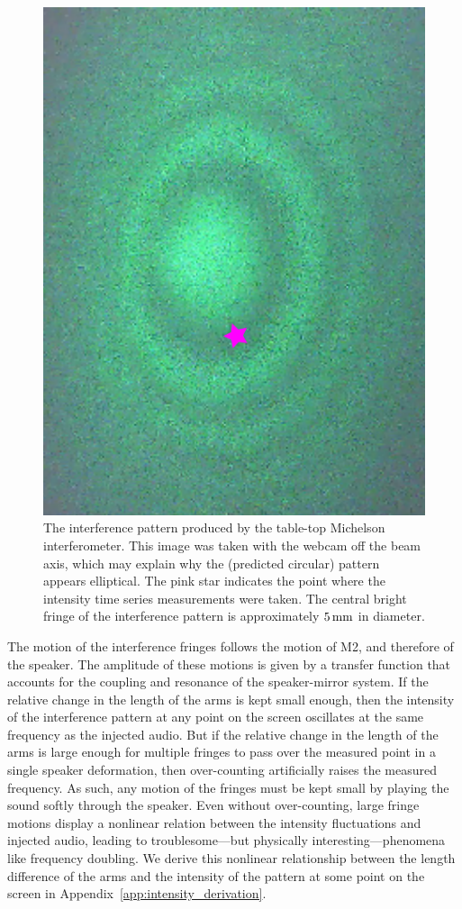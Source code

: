\documentclass[paper-main.tex]{subfiles}
\begin{document}
\begin{figure}
 \begin{center}
  \includegraphics[height=0.3\textwidth, angle=-90]{figures/webcam_still0_star.pdf}
 \end{center}
 \caption{\label{fig:interference_pattern}
The interference pattern produced by the table-top Michelson interferometer.
This image was taken with the webcam off the beam axis, which may explain why the (predicted circular) pattern appears elliptical.
The pink star indicates the point where the intensity time series measurements were taken.
The central bright fringe of the interference pattern is approximately $5\,{\rm mm}$ in diameter. 
}
\end{figure}

The motion of the interference fringes follows the motion of M2, and therefore of the speaker.
The amplitude of these motions is given by a transfer function that accounts for the coupling and resonance of the speaker-mirror system.
If the relative change in the length of the arms is kept small enough, then the intensity of the interference pattern at any point on the screen oscillates at the same frequency as the injected audio.
But if the relative change in the length of the arms is large enough for multiple fringes to pass over the measured point in a single speaker deformation, then over-counting artificially raises the measured frequency.
As such, any motion of the fringes must be kept small by playing the sound softly through the speaker.
Even without over-counting, large fringe motions display a nonlinear relation between the intensity fluctuations and injected audio, leading to troublesome---but physically interesting---phenomena like frequency doubling.
We derive this nonlinear relationship between the length difference of the arms and the intensity of the pattern at some point on the screen in Appendix~\ref{app:intensity_derivation}.


\end{document}
